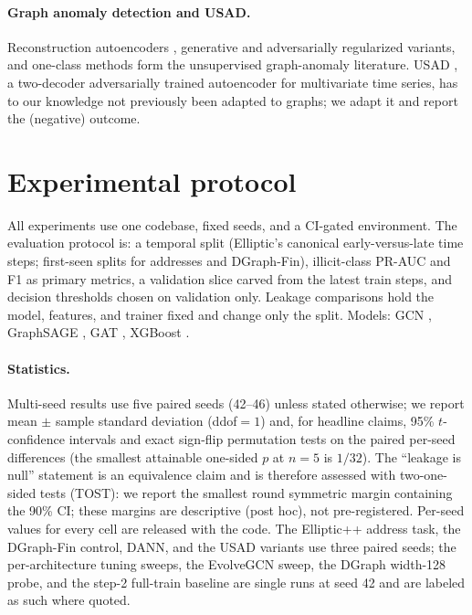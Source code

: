 \documentclass[11pt]{article}
\begin{document}
\paragraph{Graph anomaly detection and USAD.} Reconstruction autoencoders
\citep{ding2019dominant}, generative and adversarially regularized variants, and
one-class methods form the unsupervised graph-anomaly literature. USAD
\citep{audibert2020usad}, a two-decoder adversarially trained autoencoder for
multivariate time series, has to our knowledge not previously been adapted to
graphs; we adapt it and report the (negative) outcome.

\section{Experimental protocol}
\label{sec:protocol}
All experiments use one codebase, fixed seeds, and a CI-gated environment.
The evaluation protocol is: a temporal split (Elliptic's canonical early-versus-late
time steps; first-seen splits for addresses and DGraph-Fin), illicit-class PR-AUC
and F1 as primary metrics, a validation slice carved from the latest train steps,
and decision thresholds chosen on validation only. Leakage comparisons hold the
model, features, and trainer fixed and change only the split. Models: GCN
\citep{kipf2017gcn}, GraphSAGE \citep{hamilton2017graphsage}, GAT
\citep{velickovic2018gat}, XGBoost \citep{chen2016xgboost}.

\paragraph{Statistics.} Multi-seed results use five paired seeds (42--46) unless
stated otherwise; we report mean $\pm$ sample standard deviation (ddof$=1$) and,
for headline claims, 95\% $t$-confidence intervals and exact sign-flip permutation
tests on the paired per-seed differences (the smallest attainable one-sided $p$ at
$n{=}5$ is $1/32$). The ``leakage is null'' statement is an equivalence claim and
is therefore assessed with two-one-sided tests (TOST): we report the smallest
round symmetric margin containing the 90\% CI; these margins are descriptive
(post hoc), not pre-registered. Per-seed values for every cell are released with
the code. The Elliptic++ address task, the DGraph-Fin control, DANN, and the USAD
variants use three paired seeds; the per-architecture tuning sweeps, the EvolveGCN
sweep, the DGraph width-128 probe, and the step-2 full-train baseline are single
runs at seed 42 and are labeled as such where quoted.
\end{document}
